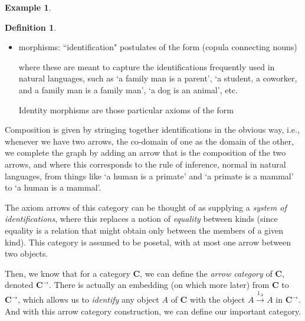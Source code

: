 \documentclass[11pt]{book}
\theoremstyle{definition}
\newtheorem{example}{Example}[section]
\theoremstyle{definition}
\newtheorem{definition}{Definition}[section]
\theoremstyle{definition}
\theoremstyle{theorem}
\theoremstyle{definition}
\begin{document}
\begin{example}
\begin{definition}
\begin{itemize}
			\begin{center} 
			\end{center}
			\item morphisms: ``identification" postulates of the form (copula connecting nouns)
			\begin{center} 
			\end{center} 
			where these are meant to capture the identifications frequently used in natural languages, such as `a family man is a parent', `a student, a coworker, and a family man is a family man', `a dog is an animal', etc. \par 
			Identity morphisms are those particular axioms of the form 
			\begin{center} 
			\end{center} 
		\end{itemize}
		Composition is given by stringing together identifications in the obvious way, i.e., whenever we have two arrows, the co-domain of one as the domain of the other, we complete the graph by adding an arrow that is the composition of the two arrows, and where this corresponds to the rule of inference, normal in natural languages, from things like `a human is a primate' and `a primate is a mammal' to `a human is a mammal'.   
	\end{definition} 
	The axiom arrows of this category can be thought of as supplying a \textit{system of identifications}, where this replaces a notion of \textit{equality} between kinds (since equality is a relation that might obtain only between the members of a given kind). This category is assumed to be posetal, with at most one arrow between two objects.\par 
Then, we know that for a category \textbf{C}, we can define the \textit{arrow category} of \textbf{C}, denoted $\textbf{C}^{\rightarrow}$. There is actually an embedding (on which more later) from $\textbf{C}$ to $\textbf{C}^{\rightarrow}$, which allows us to \textit{identify} any object $A$ of $\textbf{C}$ with the object $A \xrightarrow{1_A} A$ in $\textbf{C}^{\rightarrow}$. And with this arrow category construction, we can define our important category. 

\end{example}
\end{document}
